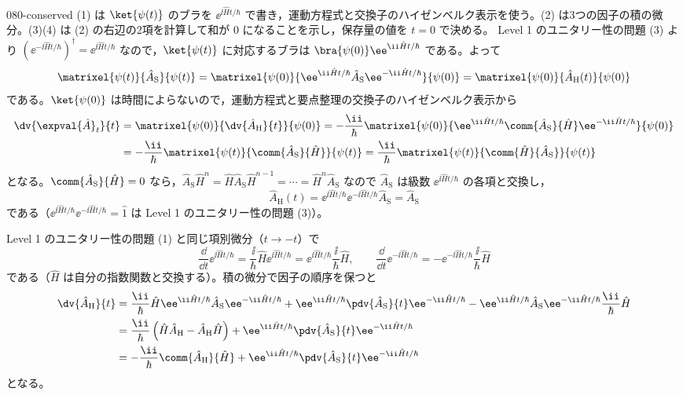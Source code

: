 \documentclass[uplatex,dvipdfmx,a4paper,11pt]{jsarticle}
\begin{document}
\begin{kaisetsu}{080-conserved}
\houshin (1) は $\ket{\psi(t)}$ のブラを $\ee^{\ii\hat{H}t/\hbar}$ で書き，運動方程式と交換子のハイゼンベルク表示を使う。(2) は3つの因子の積の微分。(3)(4) は (2) の右辺の2項を計算して和が $0$ になることを示し，保存量の値を $t=0$ で決める。
\keisan {} Level 1 のユニタリー性の問題 (3) より $(\ee^{-\ii\hat{H}t/\hbar})^{\dagger}=\ee^{\ii\hat{H}t/\hbar}$ なので，$\ket{\psi(t)}$ に対応するブラは $\bra{\psi(0)}\ee^{\ii\hat{H}t/\hbar}$ である。よって
\[ \matrixel{\psi(t)}{\hat{A}_{\mathrm{S}}}{\psi(t)}=\matrixel{\psi(0)}{\ee^{\ii\hat{H}t/\hbar}\hat{A}_{\mathrm{S}}\ee^{-\ii\hat{H}t/\hbar}}{\psi(0)}=\matrixel{\psi(0)}{\hat{A}_{\mathrm{H}}(t)}{\psi(0)} \]
である。$\ket{\psi(0)}$ は時間によらないので，運動方程式と要点整理の交換子のハイゼンベルク表示から
\begin{align*}
\dv{\expval{\hat{A}}_{t}}{t}&=\matrixel{\psi(0)}{\dv{\hat{A}_{\mathrm{H}}}{t}}{\psi(0)}=-\frac{\ii}{\hbar}\matrixel{\psi(0)}{\ee^{\ii\hat{H}t/\hbar}\comm{\hat{A}_{\mathrm{S}}}{\hat{H}}\ee^{-\ii\hat{H}t/\hbar}}{\psi(0)}\\
&=-\frac{\ii}{\hbar}\matrixel{\psi(t)}{\comm{\hat{A}_{\mathrm{S}}}{\hat{H}}}{\psi(t)}=\frac{\ii}{\hbar}\matrixel{\psi(t)}{\comm{\hat{H}}{\hat{A}_{\mathrm{S}}}}{\psi(t)}
\end{align*}
となる。$\comm{\hat{A}_{\mathrm{S}}}{\hat{H}}=0$ なら，$\hat{A}_{\mathrm{S}}\hat{H}^{n}=\hat{H}\hat{A}_{\mathrm{S}}\hat{H}^{n-1}=\cdots=\hat{H}^{n}\hat{A}_{\mathrm{S}}$ なので $\hat{A}_{\mathrm{S}}$ は級数 $\ee^{\ii\hat{H}t/\hbar}$ の各項と交換し，
\[ \hat{A}_{\mathrm{H}}(t)=\ee^{\ii\hat{H}t/\hbar}\ee^{-\ii\hat{H}t/\hbar}\hat{A}_{\mathrm{S}}=\hat{A}_{\mathrm{S}} \]
である（$\ee^{\ii\hat{H}t/\hbar}\ee^{-\ii\hat{H}t/\hbar}=\hat{1}$ は Level 1 のユニタリー性の問題 (3)）。

 Level 1 のユニタリー性の問題 (1) と同じ項別微分（$t\to-t$）で
\[ \frac{\dd}{\dd t}\ee^{\ii\hat{H}t/\hbar}=\frac{\ii}{\hbar}\hat{H}\ee^{\ii\hat{H}t/\hbar}=\ee^{\ii\hat{H}t/\hbar}\frac{\ii}{\hbar}\hat{H},\qquad \frac{\dd}{\dd t}\ee^{-\ii\hat{H}t/\hbar}=-\ee^{-\ii\hat{H}t/\hbar}\frac{\ii}{\hbar}\hat{H} \]
である（$\hat{H}$ は自分の指数関数と交換する）。積の微分で因子の順序を保つと
\begin{align*}
\dv{\hat{A}_{\mathrm{H}}}{t}&=\frac{\ii}{\hbar}\hat{H}\ee^{\ii\hat{H}t/\hbar}\hat{A}_{\mathrm{S}}\ee^{-\ii\hat{H}t/\hbar}+\ee^{\ii\hat{H}t/\hbar}\pdv{\hat{A}_{\mathrm{S}}}{t}\ee^{-\ii\hat{H}t/\hbar}-\ee^{\ii\hat{H}t/\hbar}\hat{A}_{\mathrm{S}}\ee^{-\ii\hat{H}t/\hbar}\frac{\ii}{\hbar}\hat{H}\\
&=\frac{\ii}{\hbar}\left(\hat{H}\hat{A}_{\mathrm{H}}-\hat{A}_{\mathrm{H}}\hat{H}\right)+\ee^{\ii\hat{H}t/\hbar}\pdv{\hat{A}_{\mathrm{S}}}{t}\ee^{-\ii\hat{H}t/\hbar}\\
&=-\frac{\ii}{\hbar}\comm{\hat{A}_{\mathrm{H}}}{\hat{H}}+\ee^{\ii\hat{H}t/\hbar}\pdv{\hat{A}_{\mathrm{S}}}{t}\ee^{-\ii\hat{H}t/\hbar}
\end{align*}
となる。


\end{kaisetsu}
\end{document}
